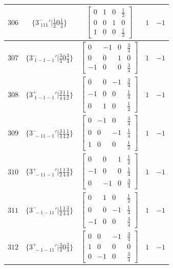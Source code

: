 \documentclass[fleqn,8pt]{jsarticle}
\begin{document}
\begin{longtable}{ccccc}
$ 306 $ & $ \{3^{-}_{\,\,111}{}'|\frac{1}{2} 0 \frac{1}{2}\} $ & $ \begin{bmatrix} 0 & 1 & 0 & \frac{1}{2} \\ 0 & 0 & 1 & 0 \\ 1 & 0 & 0 & \frac{1}{2} \end{bmatrix} $ & $ 1 $ & $ -1 $ \\ \hline
$ 307 $ & $ \{3^{-}_{\,\,1-1-1}{}'|\frac{3}{4} 0 \frac{3}{4}\} $ & $ \begin{bmatrix} 0 & -1 & 0 & \frac{3}{4} \\ 0 & 0 & 1 & 0 \\ -1 & 0 & 0 & \frac{3}{4} \end{bmatrix} $ & $ 1 $ & $ -1 $ \\ \hline
$ 308 $ & $ \{3^{+}_{\,\,1-1-1}{}'|\frac{3}{4} \frac{1}{4} \frac{1}{2}\} $ & $ \begin{bmatrix} 0 & 0 & -1 & \frac{3}{4} \\ -1 & 0 & 0 & \frac{1}{4} \\ 0 & 1 & 0 & \frac{1}{2} \end{bmatrix} $ & $ 1 $ & $ -1 $ \\ \hline
$ 309 $ & $ \{3^{-}_{\,\,-11-1}{}'|\frac{3}{4} \frac{1}{4} \frac{1}{2}\} $ & $ \begin{bmatrix} 0 & -1 & 0 & \frac{3}{4} \\ 0 & 0 & -1 & \frac{1}{4} \\ 1 & 0 & 0 & \frac{1}{2} \end{bmatrix} $ & $ 1 $ & $ -1 $ \\ \hline
$ 310 $ & $ \{3^{+}_{\,\,-11-1}{}'|\frac{1}{2} \frac{1}{4} \frac{3}{4}\} $ & $ \begin{bmatrix} 0 & 0 & 1 & \frac{1}{2} \\ -1 & 0 & 0 & \frac{1}{4} \\ 0 & -1 & 0 & \frac{3}{4} \end{bmatrix} $ & $ 1 $ & $ -1 $ \\ \hline
$ 311 $ & $ \{3^{-}_{\,\,-1-11}{}'|\frac{1}{2} \frac{1}{4} \frac{3}{4}\} $ & $ \begin{bmatrix} 0 & 1 & 0 & \frac{1}{2} \\ 0 & 0 & -1 & \frac{1}{4} \\ -1 & 0 & 0 & \frac{3}{4} \end{bmatrix} $ & $ 1 $ & $ -1 $ \\ \hline
$ 312 $ & $ \{3^{+}_{\,\,-1-11}{}'|\frac{3}{4} 0 \frac{3}{4}\} $ & $ \begin{bmatrix} 0 & 0 & -1 & \frac{3}{4} \\ 1 & 0 & 0 & 0 \\ 0 & -1 & 0 & \frac{3}{4} \end{bmatrix} $ & $ 1 $ & $ -1 $ \\ \hline

\end{longtable}
\end{document}
